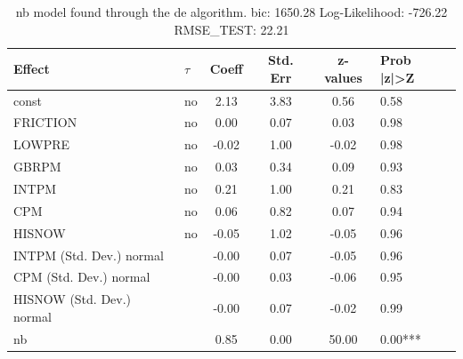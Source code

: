 \begin{table}
	\caption{nb model found through the de algorithm. bic: 1650.28 Log-Likelihood: -726.22 RMSE_TEST: 22.21}
	\begin{center}
		\begin{tabular}{|l|l|c|c|c|l|}
			\hline
			Effect & $\tau$ & Coeff & Std. Err & z-values & Prob |z|>Z \\
			\hline
			const & no & 2.13 & 3.83 & 0.56 & 0.58 \\
			\hline
			FRICTION & no & 0.00 & 0.07 & 0.03 & 0.98 \\
			\hline
			LOWPRE & no & -0.02 & 1.00 & -0.02 & 0.98 \\
			\hline
			GBRPM & no & 0.03 & 0.34 & 0.09 & 0.93 \\
			\hline
			INTPM & no & 0.21 & 1.00 & 0.21 & 0.83 \\
			\hline
			CPM & no & 0.06 & 0.82 & 0.07 & 0.94 \\
			\hline
			HISNOW & no & -0.05 & 1.02 & -0.05 & 0.96 \\
			\hline
			INTPM (Std. Dev.) normal &  & -0.00 & 0.07 & -0.05 & 0.96 \\
			\hline
			CPM (Std. Dev.) normal &  & -0.00 & 0.03 & -0.06 & 0.95 \\
			\hline
			HISNOW (Std. Dev.) normal &  & -0.00 & 0.07 & -0.02 & 0.99 \\
			\hline
			nb &  & 0.85 & 0.00 & 50.00 & 0.00*** \\
			\hline
		\end{tabular}
	\end{center}
\end{table}